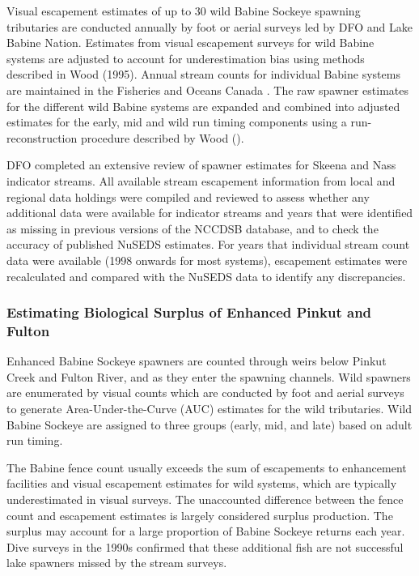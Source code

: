 \documentclass[french,11pt]{book}
\begin{document}
Visual escapement estimates of up to 30 wild Babine Sockeye spawning tributaries are conducted annually by foot or aerial surveys led by DFO and Lake Babine Nation. Estimates from visual escapement surveys for wild Babine systems are adjusted to account for underestimation bias using methods described in Wood (1995). Annual stream counts for individual Babine systems are maintained in the Fisheries and Oceans Canada . The raw spawner estimates for the different wild Babine systems are expanded and combined into adjusted estimates for the early, mid and wild run timing components using a run-reconstruction procedure described by Wood ().

DFO completed an extensive review of spawner estimates for Skeena and Nass indicator streams. All available stream escapement information from local and regional data holdings were compiled and reviewed to assess whether any additional data were available for indicator streams and years that were identified as missing in previous versions of the NCCDSB database, and to check the accuracy of published NuSEDS estimates. For years that individual stream count data were available (1998 onwards for most systems), escapement estimates were recalculated and compared with the NuSEDS data to identify any discrepancies.

\clearpage

\subsubsection{Estimating Biological Surplus of Enhanced Pinkut and Fulton}\label{SurplusEst}

Enhanced Babine Sockeye spawners are counted through weirs below Pinkut Creek and Fulton River, and as they enter the spawning channels. Wild spawners are enumerated by visual counts which are conducted by foot and aerial surveys to generate Area-Under-the-Curve (AUC) estimates for the wild tributaries. Wild Babine Sockeye are assigned to three groups (early, mid, and late) based on adult run timing.

The Babine fence count usually exceeds the sum of escapements to enhancement facilities and visual escapement estimates for wild systems, which are typically underestimated in visual surveys. The unaccounted difference between the fence count and escapement estimates is largely considered surplus production. The surplus may account for a large proportion of Babine Sockeye returns each year. Dive surveys in the 1990s confirmed that these additional fish are not successful lake spawners missed by the stream surveys.
\end{document}
